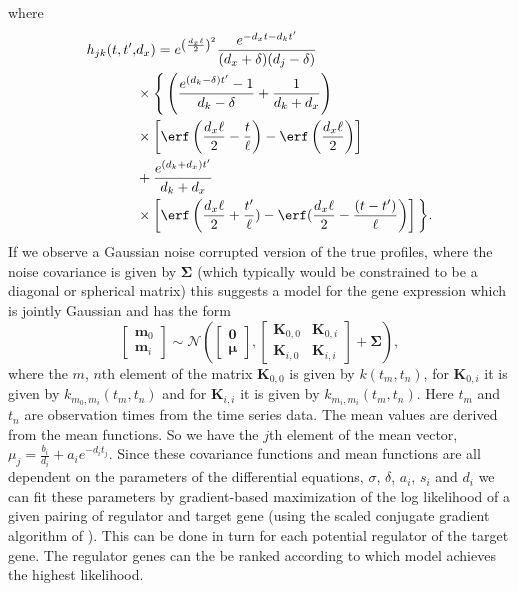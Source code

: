 \documentclass{article}
\begin{document}
where
\begin{align*}
  h_{jk}(t, t^\prime,& d_x) =  e^{\left(\frac{d_x \ell}{2}\right)^2}
  \frac{e^{-d_x t - d_k t^\prime}}{(d_x + \delta) (d_j - \delta)} \\
  &\times\Bigg\{
  \left(\frac{e^{(d_k-\delta) t^\prime} - 1}{d_k-\delta} +
    \frac{1}{d_k + d_x} \right)\\
  &\times \left[\erf\left(\frac{d_x \ell}{2} - \frac{t}{\ell}\right) - \erf\left(\frac{d_x \ell}{2}\right)\right]
  \\
  &+ \frac{e^{(d_k+d_x)t^\prime}}{d_k+d_x}\\
  &\times\left[\erf\left(\frac{d_x \ell}{2} + \frac{t^\prime}{\ell})
  - \erf(\frac{d_x \ell}{2} - \frac{(t-t^\prime)}{\ell}\right)\right]
  \bigg\}.
\end{align*}
If we  observe a Gaussian noise corrupted  version of the
true   profiles,   where   the    noise   covariance   is   given   by
$\boldsymbol{\Sigma}$ (which  typically would  be constrained to  be a
diagonal  or spherical  matrix) this  suggests  a model  for the  gene
expression which is jointly Gaussian and has the form
\begin{equation}
  \left[\begin{matrix}
      \mathbf{m}_0\\
      \mathbf{m}_i
    \end{matrix}\right]
  \sim \mathcal{N}\left(\left[\begin{matrix}\mathbf{0}\\\boldsymbol{\mu}\end{matrix}\right], \left[\begin{matrix}
        \mathbf{K}_{0,0} & \mathbf{K}_{0,i}\\
        \mathbf{K}_{i,0} & \mathbf{K}_{i,i}
      \end{matrix}
    \right] + \boldsymbol{\Sigma}\right),
\end{equation}
where the $m$, $n$th element of the matrix $\mathbf{K}_{0,0}$ is given
by   $k(t_m,t_n)$,    for   $\mathbf{K}_{0,i}$   it    is   given   by
$k_{m_0,m_i}(t_m,  t_n)$ and for  $\mathbf{K}_{i, i}$  it is  given by
$k_{m_i, m_i}(t_m,  t_n)$. Here $t_m$ and $t_n$  are observation times
from the time  series data. The mean values are  derived from the mean
functions.   So  we  have  the  $j$th  element  of  the  mean  vector,
$\mu_j=\frac{b_i}{d_i}  +  a_ie^{-d_it_j}$.   Since  these  covariance
functions and  mean functions are  all dependent on the  parameters of
the differential equations, $\sigma$, $\delta$, $a_i$, $s_i$ and $d_i$
we can fit these parameters  by gradient-based maximization of the log
likelihood of a given pairing  of regulator and target gene (using the
scaled conjugate gradient  algorithm of \cite{Moller:scg93}). This can
be done in turn for each  potential regulator of the target gene.  The
regulator genes  can the be  ranked according to which  model achieves
the highest likelihood.
\end{document}
